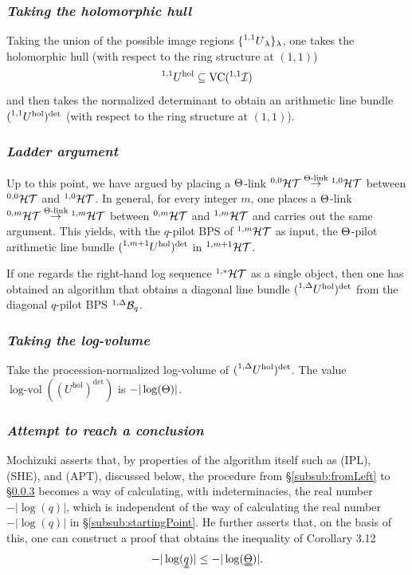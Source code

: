 \documentclass[12pt, reqno, a4paper]{amsart}
\DeclareMathOperator{\logvol}{log-vol}
\DeclareMathOperator{\hol}{hol}
\DeclareMathOperator{\VC}{VC}
\begin{document}
\subsubsection{\emph{Taking the holomorphic hull}}
Taking the union of the possible image regions $\{\prescript{1,1}{}{U}_{\lambda}\}_{\lambda}$, one takes the holomorphic hull (with respect to the ring structure at $(1, 1)$) 
\[
  \prescript{1,1}{}{U}^{\hol}\subseteq\VC(\LS[1,1])
\]
and then takes the normalized determinant to obtain an arithmetic line bundle $(\prescript{1,1}{}{U}^{\hol})^{\det}$ (with respect to the ring structure at $(1, 1)$).


\subsubsection{\emph{Ladder argument}}
Up to this point, we have argued by placing a $\Th$-link $\HT[0,0]\stackrel{\text{$\Th$-link}}{\to}\HT[1,0]$ between $\HT[0,0]$ and $\HT[1,0]$.
In general, for every integer $m$, one places a $\Th$-link $\HT[0,m]\stackrel{\text{$\Th$-link}}{\to}\HT[1,m]$ between $\HT[0,m]$ and $\HT[1,m]$ and carries out the same argument.
This yields, with the $q$-pilot BPS of $\HT[1,m]$ as input, the $\Th$-pilot arithmetic line bundle $(\prescript{1,m+1}{}{U}^{\hol})^{\det}$ in $\HT[1,m+1]$.

If one regards the right-hand log sequence $\HT[1,\ast]$ as a single object, then one has obtained an algorithm that obtains a diagonal line bundle $(\prescript{1,\Delta}{}{U}^{\hol})^{\det}$ from the diagonal $q$-pilot BPS $\BPS[1,\Delta]_q$.


\subsubsection{\emph{Taking the log-volume}}\label{subsub:fromLeftVol}
Take the procession-normalized log-volume of $(\prescript{1,\Delta}{}{U}^{\hol})^{\det}$.
The value $\logvol((U^{\hol})^{\det})$ is \(-|\log(\Th)|\).


\subsubsection{\emph{Attempt to reach a conclusion}}\label{subsub:finalArgument}
Mochizuki asserts that, by properties of the algorithm itself such as (IPL), (SHE), and (APT), discussed below, the procedure from \S\ref{subsub:fromLeft} to \S\ref{subsub:fromLeftVol} becomes a way of calculating, with indeterminacies, the real number $-|\log(q)|$, which is independent of the way of calculating the real number $-|\log(q)|$ in \S\ref{subsub:startingPoint}.  
He further asserts that, on the basis of this, one can construct a proof that obtains the inequality of Corollary 3.12
\begin{equation}\label{eqn:Cor312FinalInequality}
  -|\log(\uuqq)|\leq -|\log(\uuTh)|.
\end{equation}
\end{document}
